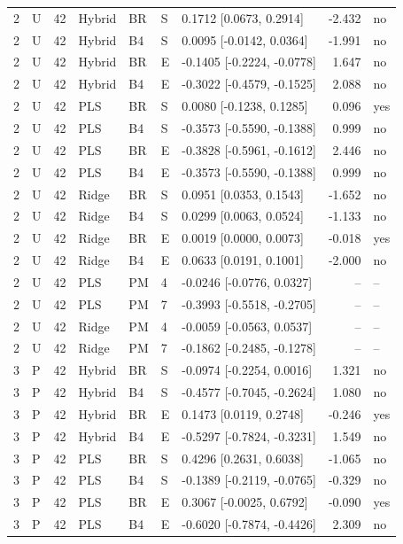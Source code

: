 \documentclass[10pt,a4paper]{article}
\begin{document}
\begin{longtable}{rlrllllrl}
2 & U & 42 & Hybrid & BR & S & 0.1712 [0.0673, 0.2914] & -2.432 & no \\
2 & U & 42 & Hybrid & B4 & S & 0.0095 [-0.0142, 0.0364] & -1.991 & no \\
2 & U & 42 & Hybrid & BR & E & -0.1405 [-0.2224, -0.0778] & 1.647 & no \\
2 & U & 42 & Hybrid & B4 & E & -0.3022 [-0.4579, -0.1525] & 2.088 & no \\
2 & U & 42 & PLS & BR & S & 0.0080 [-0.1238, 0.1285] & 0.096 & yes \\
2 & U & 42 & PLS & B4 & S & -0.3573 [-0.5590, -0.1388] & 0.999 & no \\
2 & U & 42 & PLS & BR & E & -0.3828 [-0.5961, -0.1612] & 2.446 & no \\
2 & U & 42 & PLS & B4 & E & -0.3573 [-0.5590, -0.1388] & 0.999 & no \\
2 & U & 42 & Ridge & BR & S & 0.0951 [0.0353, 0.1543] & -1.652 & no \\
2 & U & 42 & Ridge & B4 & S & 0.0299 [0.0063, 0.0524] & -1.133 & no \\
2 & U & 42 & Ridge & BR & E & 0.0019 [0.0000, 0.0073] & -0.018 & yes \\
2 & U & 42 & Ridge & B4 & E & 0.0633 [0.0191, 0.1001] & -2.000 & no \\
2 & U & 42 & PLS & PM & 4 & -0.0246 [-0.0776, 0.0327] & -- & -- \\
2 & U & 42 & PLS & PM & 7 & -0.3993 [-0.5518, -0.2705] & -- & -- \\
2 & U & 42 & Ridge & PM & 4 & -0.0059 [-0.0563, 0.0537] & -- & -- \\
2 & U & 42 & Ridge & PM & 7 & -0.1862 [-0.2485, -0.1278] & -- & -- \\
3 & P & 42 & Hybrid & BR & S & -0.0974 [-0.2254, 0.0016] & 1.321 & no \\
3 & P & 42 & Hybrid & B4 & S & -0.4577 [-0.7045, -0.2624] & 1.080 & no \\
3 & P & 42 & Hybrid & BR & E & 0.1473 [0.0119, 0.2748] & -0.246 & yes \\
3 & P & 42 & Hybrid & B4 & E & -0.5297 [-0.7824, -0.3231] & 1.549 & no \\
3 & P & 42 & PLS & BR & S & 0.4296 [0.2631, 0.6038] & -1.065 & no \\
3 & P & 42 & PLS & B4 & S & -0.1389 [-0.2119, -0.0765] & -0.329 & no \\
3 & P & 42 & PLS & BR & E & 0.3067 [-0.0025, 0.6792] & -0.090 & yes \\
3 & P & 42 & PLS & B4 & E & -0.6020 [-0.7874, -0.4426] & 2.309 & no \\

\end{longtable}
\end{document}
